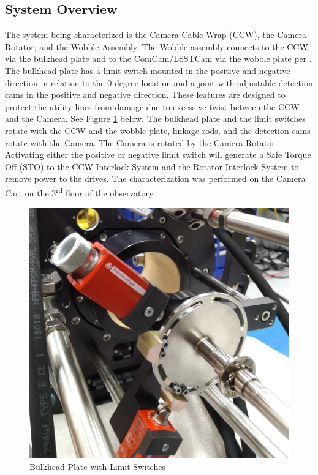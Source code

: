 \documentclass[SE,authoryear,toc, lsstdraft]{lsstdoc}
\begin{document}
\subsection{System Overview}

The system being characterized is the Camera Cable Wrap (CCW), the Camera Rotator,
and the Wobble Assembly. The Wobble assembly connects to the CCW via the bulkhead plate
and to the ComCam/LSSTCam via the wobble plate per . The bulkhead plate has a
limit switch mounted in the positive and negative direction in relation to the
0 degree location and a joint with adjustable detection cams in the positive
and negative direction. These features are designed to protect the utility lines
from damage due to excessive twist between the CCW and the Camera. See Figure \ref{fig:Figure_1} below.
The bulkhead plate and the limit switches rotate with the CCW and the wobble plate,
linkage rods, and the detection cams rotate with the Camera. The Camera is rotated
by the Camera Rotator. Activating either the positive or negative limit switch will
generate a Safe Torque Off (STO) to the CCW Interlock System and the Rotator Interlock
System to remove power to the drives. The characterization was performed on the
Camera Cart on the 3\textsuperscript{rd} floor of the observatory.

\begin{figure}[h!]
  \includegraphics[width=\linewidth]{media/Figure_1.png}
  \caption{Bulkhead Plate with Limit Switches}
  \label{fig:Figure_1}
\end{figure}
\end{document}
